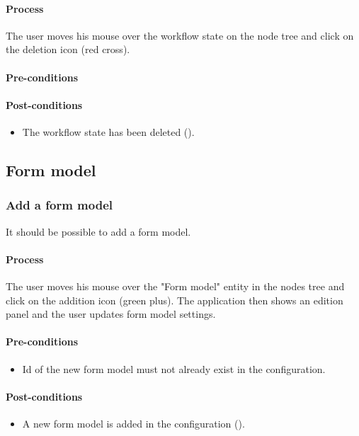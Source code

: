 \documentclass[11pt,a4paper,oneside]{article}
\begin{document}
\paragraph{Process}
The user moves his mouse over the workflow state on the node tree and click on the deletion icon (red cross).

\paragraph{Pre-conditions}

\paragraph{Post-conditions}
\begin{itemize}
	\item The workflow state has been deleted ().
\end{itemize}

\subsection{Form model}

\subsubsection{Add a form model}
It should be possible to add a form model.

\paragraph{Process}
The user moves his mouse over the "Form model" entity in the nodes tree and click on the addition icon (green plus). The application then shows an edition panel and the user updates form model settings.

\paragraph{Pre-conditions}
\begin{itemize}
	\item Id of the new form model must not already exist in the configuration.
\end{itemize}

\paragraph{Post-conditions}
\begin{itemize}
	\item A new form model is added in the configuration ().
\end{itemize}
\end{document}
